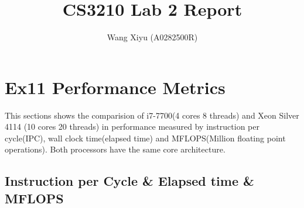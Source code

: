 \documentclass[9pt]{extarticle}
\begin{document}
\title{CS3210 Lab 2 Report}
\author{
  Wang Xiyu (A0282500R)
}
\maketitle
\section*{Ex11 Performance Metrics}
This sections shows the comparision of i7-7700(4 cores 8 threads) 
and Xeon Silver 4114 (10 cores 20 threads) in performance measured
 by instruction per cycle(IPC), wall clock time(elapsed time)
  and MFLOPS(Million floating point operations). 
  Both processors have the same core architecture.
\par\vspace{-0.5ex}
\subsection*{Instruction per Cycle \& Elapsed time \& MFLOPS}
\begin{minipage}{0.5\linewidth}
    \noindent{}
\end{minipage}\hfill
\begin{minipage}{0.5\linewidth}
  \noindent{}
\end{minipage}\hfill
\end{document}
